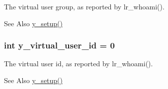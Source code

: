 The virtual user group, as reported by lr\-\_\-whoami(). 

\begin{DoxySeeAlso}{See Also}
\hyperlink{group__core_ga7350ca6bb0383b2169ef4eaae3b091e7}{y\-\_\-setup()} 
\end{DoxySeeAlso}
\hypertarget{group__core_ga312065213820734af47b86c233a26c0d}{
\subsubsection[{y\-\_\-virtual\-\_\-user\-\_\-id}]{\setlength{\rightskip}{0pt plus 5cm}int y\-\_\-virtual\-\_\-user\-\_\-id = 0}}\label{group__core_ga312065213820734af47b86c233a26c0d}


The virtual user id, as reported by lr\-\_\-whoami(). 

\begin{DoxySeeAlso}{See Also}
\hyperlink{group__core_ga7350ca6bb0383b2169ef4eaae3b091e7}{y\-\_\-setup()} 
\end{DoxySeeAlso}

